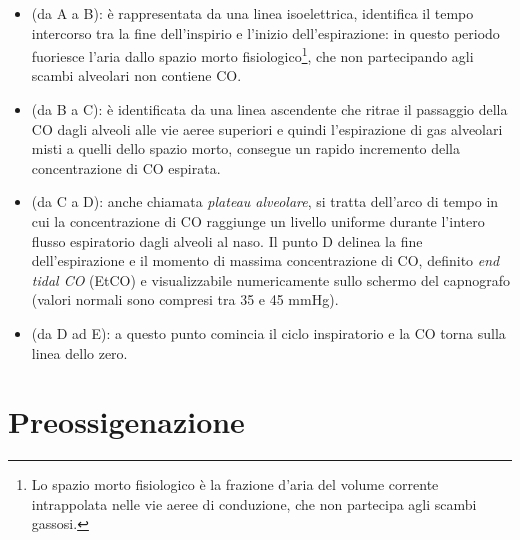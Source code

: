 \begin{itemize}
    \item {} \small{(da A a B)}: è rappresentata da una linea isoelettrica, identifica il tempo intercorso tra la fine dell’inspirio e l’inizio dell’espirazione: in questo periodo fuoriesce l'aria dallo spazio morto fisiologico\footnote{Lo spazio morto fisiologico è la frazione d'aria del volume corrente intrappolata nelle vie aeree di conduzione, che non partecipa agli scambi gassosi.}, che non partecipando agli scambi alveolari non contiene CO.
    \item {} \small{(da B a C)}: è identificata da una linea ascendente che ritrae il passaggio della CO dagli alveoli alle vie aeree superiori e quindi l'espirazione di gas alveolari misti a quelli dello spazio morto, consegue un rapido incremento della concentrazione di CO espirata.
    \item {} \small{(da C a D)}: anche chiamata \emph{plateau alveolare}, si tratta dell'arco di tempo in cui la concentrazione di CO raggiunge un livello uniforme durante l'intero flusso espiratorio dagli alveoli al naso. Il punto D delinea la fine dell'espirazione e il momento di massima concentrazione di CO, definito \emph{end tidal CO} (EtCO) e visualizzabile numericamente sullo schermo del capnografo (valori normali sono compresi tra 35 e 45 mmHg).
    \item {} \small{(da D ad E)}: a questo punto comincia il ciclo inspiratorio e la CO torna sulla linea dello zero. 
    
\end{itemize}



\section{Preossigenazione}

